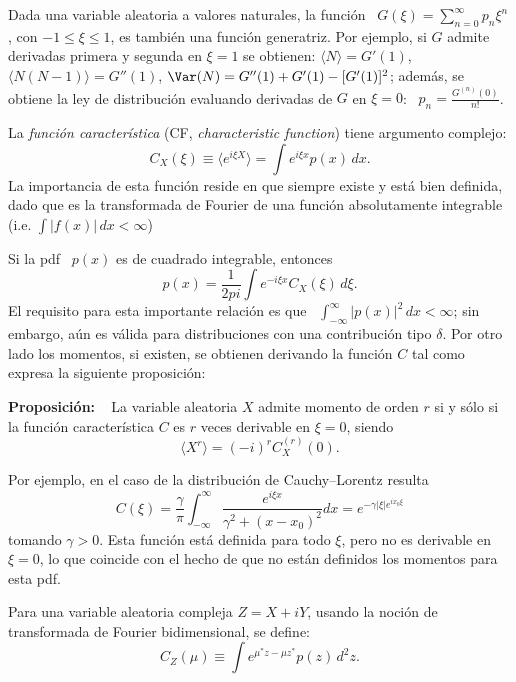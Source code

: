 {Dada   una   variable   aleatoria   a   valores  naturales,   la   funci\'on   \
$G(\xi)=\sum_{n=0}^{\infty} p_n \xi^n$, con $-1\leq \xi\leq 1$, %
es  tambi\'en una  funci\'on generatriz.  Por ejemplo,  si $G$  admite derivadas
primera  y segunda en  $\xi=1$ se  obtienen: $\langle  N\rangle=G'(1)$, $\langle
N(N-1)\rangle=G''(1)$, $\Var(N)=G''(1)+G'(1)-[G'(1)]^2$; adem\'as, se obtiene la
ley   de   distribuci\'on   evaluando   derivadas   de   $G$   en   $\xi=0$:   \
$p_n=\frac{G^{(n)}(0)}{n!}$.  %
\cite{Fra09}%




La \emph{funci\'on caracter\'istica}  (CF, \emph{characteristic function}) tiene
argumento complejo: \cite{Luk61}
$$
C_X(\xi) \equiv \langle e^{i \xi X} \rangle = \int e^{i \xi x} p(x) \, dx .
$$
La importancia  de esta  funci\'on reside  en que siempre  existe y  est\'a bien
definida, dado que es la  transformada de Fourier de una funci\'on absolutamente
integrable (i.e. $\int |f(x)| \, dx < \infty$) \cite{Gol61}

Si la pdf \ $p(x)$ es de cuadrado integrable, entonces 
$$
p(x) = \frac{1}{2	pi} \int e^{-i \xi x} C_X(\xi) \, d\xi .
$$
El requisito  para esta importante relaci\'on es  que \ $\int_{-\infty}^{\infty}
|p(x)|^2 \, dx<\infty$;  sin embargo, a\'un es v\'alida  para distribuciones con
una contribuci\'on  tipo $\delta$.  Por otro  lado los momentos,  si existen, se
obtienen derivando la funci\'on $C$ tal como expresa la siguiente proposici\'on:

\textbf{Proposici\'on:} \ %
La  variable aleatoria  $X$  admite  momento de  orden  $r$ si  y  s\'olo si  la
funci\'on caracter\'istica $C$ es $r$ veces derivable en $\xi=0$, siendo
$$
\langle X^r\rangle = (-i)^r C_X^{(r)}(0) . 
$$

Por ejemplo, en el caso de la distribuci\'on de Cauchy--Lorentz resulta
$$
C(\xi)     =     \frac{\gamma}{\pi}    \int_{-\infty}^{\infty}     \frac{e^{i\xi
    x}}{\gamma^2+(x-x_0)^2} dx = e^{-\gamma |\xi| e^{i x_0\xi}}
$$
tomando $\gamma >0$. Esta funci\'on est\'a  definida para todo $\xi$, pero no es
derivable en $\xi=0$,  lo que coincide con el hecho de  que no est\'an definidos
los momentos para esta pdf.

Para  una   variable  aleatoria  compleja   $Z=X+iY$,  usando  la   noci\'on  de
transformada de Fourier bidimensional, se define:
$$
C_Z(\mu) \equiv \int e^{\mu^* z-\mu z^*} p(z) \, d^2z .
$$

}
